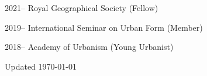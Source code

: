 \documentclass[12pt,a4paper]{report}
\begin{document}
    \begin{tablist}

        \item[2021--] \tab{}Royal Geographical Society (Fellow)
        \item[2019--] \tab{}International Seminar on Urban Form (Member)
        \item[2018--] \tab{}Academy of Urbanism (Young Urbanist)

    \end{tablist}

    \begin{center}
        \vfill
        Updated \monthyeardate\today
    \end{center}
\end{document}
